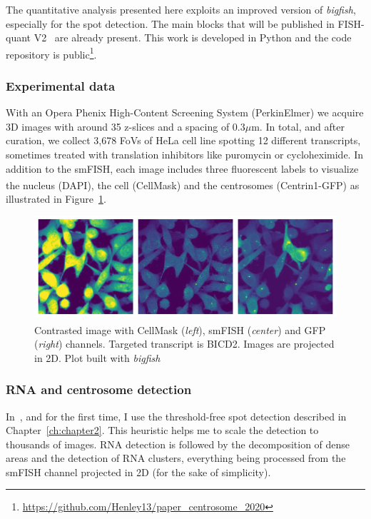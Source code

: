 The quantitative analysis presented here exploits an improved version of \emph{bigfish}, especially for the spot detection.
The main blocks that will be published in FISH-quant V2~\cite{Imbert_fq_2022} are already present.
This work is developed in Python and the code repository is public\footnote{\url{https://github.com/Henley13/paper_centrosome_2020}}.

\subsubsection{Experimental data}

With an Opera Phenix High-Content Screening System (PerkinElmer) we acquire 3D images with around 35 z-slices and a spacing of 0.3$\mu$m.
In total, and after curation, we collect 3,678 \ac{FoV}s of HeLa cell line spotting 12 different transcripts, sometimes treated with translation inhibitors like puromycin or cycloheximide.
In addition to the \ac{smFISH}, each image includes three fluorescent labels to visualize the nucleus (DAPI), the cell (CellMask\textsuperscript{\texttrademark}) and the centrosomes (Centrin1-\ac{GFP}) as illustrated in Figure~\ref{fig:fov_adham}.

\begin{figure}[]
    \centering
    \includegraphics[width=\textwidth]{figures/chapter5/FoV_BICD2}
    \caption[Contrasted image with CellMask\textsuperscript{\texttrademark}, smFISH and GFP channels]{Contrasted image with CellMask\textsuperscript{\texttrademark} (\textit{left}), smFISH (\textit{center}) and GFP (\textit{right}) channels.
	Targeted transcript is BICD2.
	Images are projected in 2D.
	Plot built with \emph{bigfish}}
    \label{fig:fov_adham}
\end{figure}

\subsubsection{RNA and centrosome detection}

In~\cite{safieddine_choreography_2021}, and for the first time, I use the threshold-free spot detection described in Chapter~\ref{ch:chapter2}.
This heuristic helps me to scale the detection to thousands of images.
\ac{RNA} detection is followed by the decomposition of dense areas and the detection of \ac{RNA} clusters, everything being processed from the \ac{smFISH} channel projected in 2D (for the sake of simplicity).


